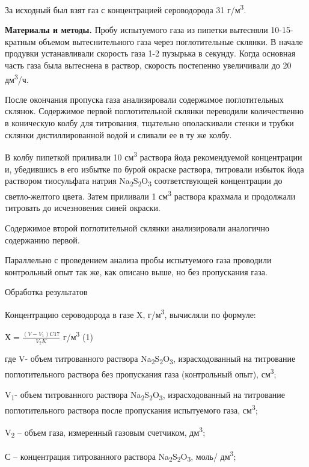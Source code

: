 За исходный был взят газ с концентрацией сероводорода 31
г/м\textsuperscript{3}.

{\bfseries Материалы и методы.} Пробу испытуемого газа из пипетки вытесняли
10-15-кратным объемом вытеснительного газа через поглотительные склянки.
В начале продувки устанавливали скорость газа 1-2 пузырька в секунду.
Когда основная часть газа была вытеснена в раствор, скорость постепенно
увеличивали до 20 дм\textsuperscript{3}/ч.

После окончания пропуска газа анализировали содержимое поглотительных
склянок. Содержимое первой поглотительной склянки переводили
количественно в коническую колбу для титрования, тщательно ополаскивали
стенки и трубки склянки дистиллированной водой и сливали ее в ту же
колбу.

В колбу пипеткой приливали 10 см\textsuperscript{3} раствора йода
рекомендуемой концентрации и, убедившись в его избытке по бурой окраске
раствора, титровали избыток йода раствором тиосульфата натрия
Na\textsubscript{2}S\textsubscript{2}O\textsubscript{3} соответствующей
концентрации до светло-желтого цвета. Затем приливали 1
см\textsuperscript{3} раствора крахмала и продолжали титровать до
исчезновения синей окраски.

Содержимое второй поглотительной склянки анализировали аналогично
содержанию первой.

Параллельно с проведением анализа пробы испытуемого газа проводили
контрольный опыт так же, как описано выше, но без пропускания газа.

Обработка результатов

Концентрацию сероводорода в газе X, г/м\textsuperscript{3}, вычисляли по
формуле:

\(Х = \frac{\left( V - V_{1} \right)C17}{V_{2}K}\)
г/м\textsuperscript{3} (1)

где V- объем титрованного раствора
Na\textsubscript{2}S\textsubscript{2}O\textsubscript{3}, израсходованный
на титрование поглотительного раствора без пропускания газа (контрольный
опыт), см\textsuperscript{3};

V\textsubscript{1}- объем титрованного раствора
Na\textsubscript{2}S\textsubscript{2}O\textsubscript{3}, израсходованный
на титрование поглотительного раствора после пропускания испытуемого
газа, см\textsuperscript{3};

V\textsubscript{2} -- объем газа, измеренный газовым счетчиком,
дм\textsuperscript{3};

С -- концентрация титрованного раствора
Na\textsubscript{2}S\textsubscript{2}O\textsubscript{3}, моль/
дм\textsuperscript{3};

